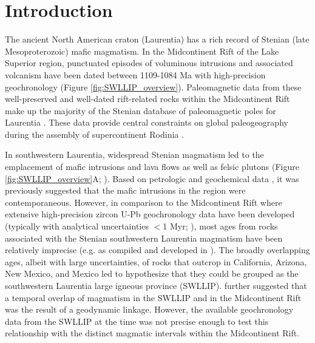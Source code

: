 \section{Introduction}

The ancient North American craton (Laurentia) has a rich record of Stenian (late Mesoproterozoic) mafic magmatism. In the Midcontinent Rift of the Lake Superior region, punctuated episodes of voluminous intrusions and associated volcanism have been dated between 1109-1084 Ma with high-precision geochronology (Figure \ref{fig:SWLLIP_overview}). Paleomagnetic data from these well-preserved and well-dated rift-related rocks within the Midcontinent Rift make up the majority of the Stenian database of paleomagnetic poles for Laurentia \citep{Evans2021a}. These data provide central constraints on global paleogeography during the assembly of supercontinent Rodinia \citep{Swanson-Hysell2021c, Evans2021b}. 

In southwestern Laurentia, widespread Stenian magmatism led to the emplacement of mafic intrusions and lava flows as well as felsic plutons (Figure \ref{fig:SWLLIP_overview}A; \cite{Wrucke1966a, Shride1967a, Hendricks1972a, Howard1991a, Bright2014a}). Based on petrologic and geochemical data \cite[e.g.][]{Wrucke1966a, Wrucke1972a, Hammond1986a}, it was previously suggested that the mafic intrusions in the region were contemporaneous. However, in comparison to the Midcontinent Rift where extensive high-precision zircon U-Pb geochronology data have been developed (typically with analytical uncertainties $<$1 Myr; \cite[e.g.][]{Swanson-Hysell2019a}), most ages from rocks associated with the Stenian southwestern Laurentia magmatism have been relatively imprecise (e.g. as compiled and developed in \cite{Bright2014a}). The broadly overlapping ages, albeit with large uncertainties, of rocks that outcrop in California, Arizona, New Mexico, and Mexico led \cite{Bright2014a} to hypothesize that they could be grouped as the southwestern Laurentia large igneous province (SWLLIP). \cite{Bright2014a} further suggested that a temporal overlap of magmatism in the SWLLIP and in the Midcontinent Rift was the result of a geodynamic linkage. However, the available geochronology data from the SWLLIP at the time was not precise enough to test this relationship with the distinct magmatic intervals within the Midcontinent Rift. 

